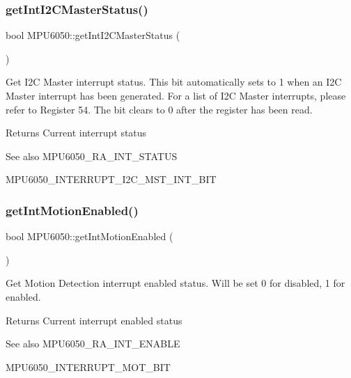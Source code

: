 \subsubsection{\texorpdfstring{getIntI2CMasterStatus()}{getIntI2CMasterStatus()}}
{\footnotesize\ttfamily bool M\+P\+U6050\+::get\+Int\+I2\+C\+Master\+Status (\begin{DoxyParamCaption}{ }\end{DoxyParamCaption})}

Get I2C Master interrupt status. This bit automatically sets to 1 when an I2C Master interrupt has been generated. For a list of I2C Master interrupts, please refer to Register 54. The bit clears to 0 after the register has been read. \begin{DoxyReturn}{Returns}
Current interrupt status 
\end{DoxyReturn}
\begin{DoxySeeAlso}{See also}
M\+P\+U6050\+\_\+\+R\+A\+\_\+\+I\+N\+T\+\_\+\+S\+T\+A\+T\+US 

M\+P\+U6050\+\_\+\+I\+N\+T\+E\+R\+R\+U\+P\+T\+\_\+\+I2\+C\+\_\+\+M\+S\+T\+\_\+\+I\+N\+T\+\_\+\+B\+IT 
\end{DoxySeeAlso}
\mbox{\label{class_m_p_u6050_a7de31a8e9f22765329d9f9e02db2f1f0}} 
\subsubsection{\texorpdfstring{getIntMotionEnabled()}{getIntMotionEnabled()}}
{\footnotesize\ttfamily bool M\+P\+U6050\+::get\+Int\+Motion\+Enabled (\begin{DoxyParamCaption}{ }\end{DoxyParamCaption})}

Get Motion Detection interrupt enabled status. Will be set 0 for disabled, 1 for enabled. \begin{DoxyReturn}{Returns}
Current interrupt enabled status 
\end{DoxyReturn}
\begin{DoxySeeAlso}{See also}
M\+P\+U6050\+\_\+\+R\+A\+\_\+\+I\+N\+T\+\_\+\+E\+N\+A\+B\+LE 

M\+P\+U6050\+\_\+\+I\+N\+T\+E\+R\+R\+U\+P\+T\+\_\+\+M\+O\+T\+\_\+\+B\+IT 
\end{DoxySeeAlso}
\mbox{\label{class_m_p_u6050_ac0c0836aa0d237cac92d11591efd0d9f}} 
